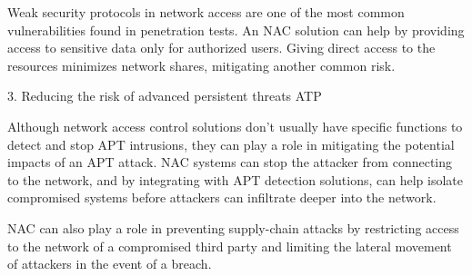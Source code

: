 Weak security protocols in network access are one of the most common vulnerabilities found in penetration tests. An NAC solution can help by providing access to sensitive data only for authorized users. Giving direct access to the resources minimizes network shares, mitigating another common risk.

3. Reducing the risk of advanced persistent threats ATP

Although network access control solutions don’t usually have specific functions to detect and stop APT intrusions, they can play a role in mitigating the potential impacts of an APT attack. NAC systems can stop the attacker from connecting to the network, and by integrating with APT detection solutions, can help isolate compromised systems before attackers can infiltrate deeper into the network.

NAC can also play a role in preventing supply-chain attacks by restricting access to the network of a compromised third party and limiting the lateral movement of attackers in the event of a breach.

 
